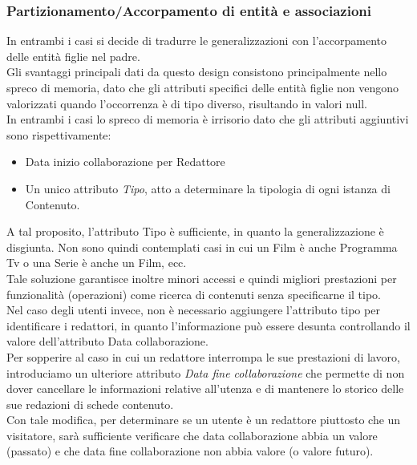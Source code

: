 \documentclass[a4paper]{article}
\begin{document}
\subsubsection{Partizionamento/Accorpamento di entità e associazioni}
In entrambi i casi si decide di tradurre le generalizzazioni con l'accorpamento delle entità figlie 
nel padre.\\
Gli svantaggi principali dati da questo design consistono principalmente nello spreco di memoria, dato che 
gli attributi specifici delle entità figlie non vengono valorizzati quando l'occorrenza è di tipo diverso, risultando 
in valori null.\\
In entrambi i casi lo spreco di memoria è irrisorio dato che gli attributi aggiuntivi sono rispettivamente:\\
\begin{itemize}
  \item Data inizio collaborazione per Redattore \\
\item Un unico attributo \emph{Tipo}, atto a determinare la tipologia di ogni istanza di Contenuto.\\
\end{itemize}
A tal proposito, l'attributo Tipo è sufficiente, in quanto la generalizzazione è disgiunta. Non sono quindi
contemplati casi in cui un Film è anche Programma Tv o una Serie è anche un Film, ecc.\\
Tale soluzione garantisce inoltre minori accessi e quindi migliori prestazioni per funzionalità (operazioni)
come ricerca di contenuti senza specificarne il tipo.\\
Nel caso degli utenti invece, non è necessario aggiungere l'attributo tipo per identificare i redattori, in quanto l'informazione
può essere desunta controllando il valore dell'attributo Data collaborazione. \\
Per sopperire al caso in cui un redattore interrompa le sue prestazioni di lavoro, introduciamo un ulteriore attributo \emph{Data fine collaborazione}
che permette di non dover cancellare le informazioni relative all'utenza e di mantenere lo storico delle sue redazioni di 
schede contenuto.\\
Con tale modifica, per determinare se un utente è un redattore piuttosto che un visitatore, sarà sufficiente verificare che 
data collaborazione abbia un valore (passato) e che data fine collaborazione non abbia valore (o valore futuro). \\
\end{document}

